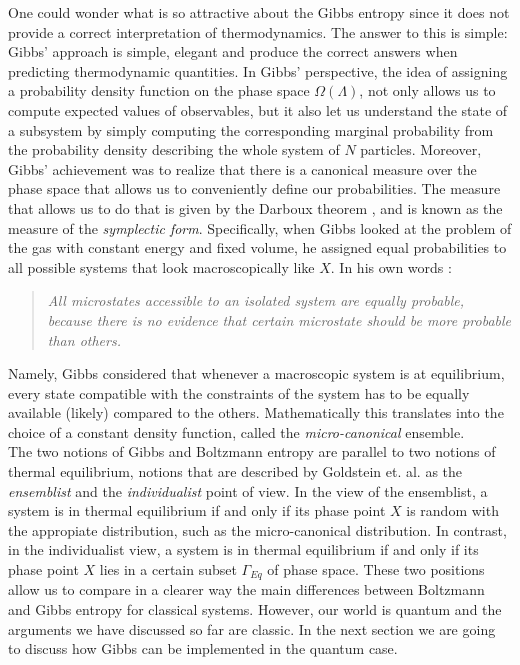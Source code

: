 \indent One could wonder what is so attractive about the Gibbs entropy since it does not provide a correct interpretation of thermodynamics. The answer to this is simple: Gibbs' approach is simple, elegant and produce the correct answers when predicting thermodynamic quantities. In Gibbs' perspective, the idea of assigning a probability density function on the phase space $\Omega(\Lambda)$, not only allows us to compute expected values of observables, but it also let us understand the state of a subsystem by simply computing the corresponding marginal probability from the probability density describing the whole system of $N$ particles. Moreover, Gibbs' achievement \cite{gibbs_elementary_1902} was to realize that there is a canonical measure over the phase space that allows us to conveniently define our probabilities. The measure that allows us to do that is given by the Darboux theorem \cite{butterfield_symplectic_2007, butterfield_representation_2007}, and is known as the measure of the \textit{symplectic form}. Specifically, when Gibbs looked at the problem of the gas with constant energy and fixed volume, he assigned equal probabilities to all possible systems that look macroscopically like $X$. In his own words \cite{gibbs_elementary_1902}:
\begin{quote}
\textit{All microstates accessible to an isolated system are equally probable, because there is no evidence that certain microstate should be more probable than others.}
\end{quote}

\indent Namely, Gibbs considered that whenever a macroscopic system is at equilibrium, every state compatible with the constraints of the system has to be equally available (likely) compared to the others. Mathematically this translates into the choice of a constant density function, called the \textit{micro-canonical} ensemble.\\

\indent The two notions of Gibbs and Boltzmann entropy are parallel to two notions of thermal equilibrium, notions that are described by Goldstein et. al.\cite{goldstein_gibbs_2020} as the \textit{ensemblist} and the \textit{individualist} point of view. In the view of the ensemblist, a system is in thermal equilibrium if and only if its phase point $X$ is random with the appropiate distribution, such as the micro-canonical distribution. In contrast, in the individualist view, a system is in thermal equilibrium if and only if its phase point $X$ lies in a certain subset $\Gamma_{Eq}$ of phase space. These two positions allow us to compare in a clearer way the main differences between Boltzmann and Gibbs entropy for classical systems. However, our world is quantum and the arguments we have discussed so far are classic. In the next section we are going to discuss how Gibbs can be implemented in the quantum case.

